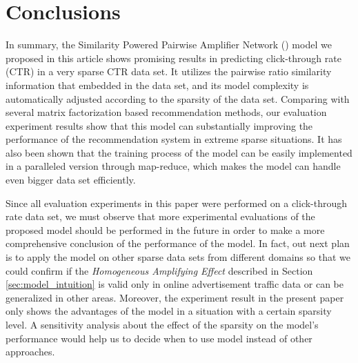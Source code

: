 \section{Conclusions}
\label{sec:conclusion}
In summary, the Similarity Powered Pairwise Amplifier Network
({\sppan}) model we proposed in this article shows promising results
in predicting click-through rate (CTR) in a very sparse CTR data
set. It utilizes the pairwise ratio similarity information that
embedded in the data set, and its model complexity is automatically
adjusted according to the sparsity of the data set. Comparing with
several matrix factorization based recommendation methods, our
evaluation experiment results show that this model can substantially
improving the performance of the recommendation system in extreme
sparse situations. It has also been shown that the training process of
the {\sppan} model can be easily implemented in a paralleled version
through map-reduce, which makes the model can handle even bigger data
set efficiently.

Since all evaluation experiments in this paper were performed on a
click-through rate data set, we must observe that more experimental
evaluations of the proposed {\sppan} model should be performed in the
future in order to make a more comprehensive conclusion of the
performance of the model. In fact, out next plan is to apply the
{\sppan} model on other sparse data sets from different domains so
that we could confirm if the {\it Homogeneous Amplifying Effect}
described in Section \ref{sec:model_intuition} is valid only in online
advertisement traffic data or can be generalized in other
areas. Moreover, the experiment result in the present paper only shows
the advantages of the {\sppan} model in a situation with a certain
sparsity level. A sensitivity analysis about the effect of the
sparsity on the model's performance would help us to decide when to
use {\sppan} model instead of other approaches.
